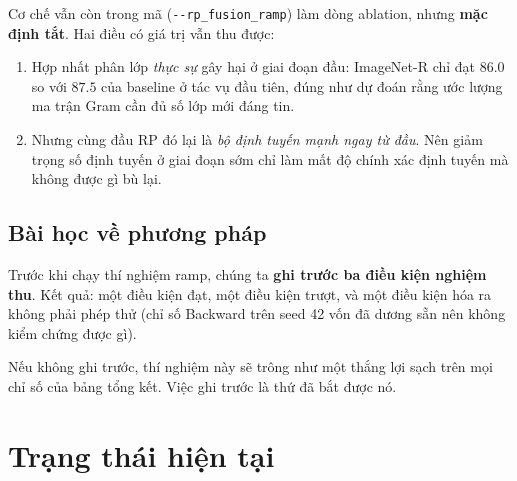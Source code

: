 \documentclass[11pt,a4paper]{article}
\begin{document}
Cơ chế vẫn còn trong mã (\texttt{-{}-rp\_fusion\_ramp}) làm dòng ablation, nhưng
\textbf{mặc định tắt}. Hai điều có giá trị vẫn thu được:

\begin{enumerate}
\item Hợp nhất phân lớp \emph{thực sự} gây hại ở giai đoạn đầu: ImageNet-R chỉ
      đạt $86.0$ so với $87.5$ của baseline ở tác vụ đầu tiên, đúng như dự đoán
      rằng ước lượng ma trận Gram cần đủ số lớp mới đáng tin.
\item Nhưng cùng đầu RP đó lại là \emph{bộ định tuyến mạnh ngay từ đầu}. Nên giảm
      trọng số định tuyến ở giai đoạn sớm chỉ làm mất độ chính xác định tuyến mà
      không được gì bù lại.
\end{enumerate}

\subsection{Bài học về phương pháp}

Trước khi chạy thí nghiệm ramp, chúng ta \textbf{ghi trước ba điều kiện nghiệm
thu}. Kết quả: một điều kiện đạt, một điều kiện trượt, và một điều kiện hóa ra
không phải phép thử (chỉ số Backward trên seed 42 vốn đã dương sẵn nên không kiểm
chứng được gì).

Nếu không ghi trước, thí nghiệm này sẽ trông như một thắng lợi sạch trên mọi chỉ
số của bảng tổng kết. Việc ghi trước là thứ đã bắt được nó.

\section*{Trạng thái hiện tại}
\end{document}

